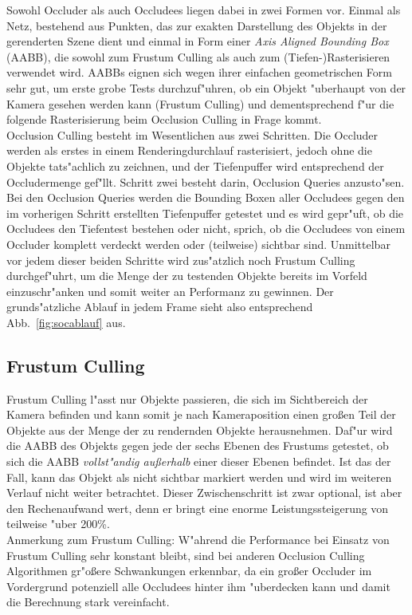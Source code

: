 \documentclass[journal]{vgtc}
\begin{document}
Sowohl Occluder als auch Occludees liegen dabei in zwei Formen vor.
Einmal als Netz, bestehend aus Punkten, das zur exakten Darstellung des Objekts in der gerenderten Szene dient und einmal in Form einer \textit{Axis Aligned Bounding Box} (AABB), die sowohl zum Frustum Culling als auch zum (Tiefen-)Rasterisieren verwendet wird.
AABBs eignen sich wegen ihrer einfachen geometrischen Form sehr gut, um erste grobe Tests durchzuf"uhren, ob ein Objekt "uberhaupt von der Kamera gesehen werden kann (Frustum Culling) und dementsprechend f"ur die folgende Rasterisierung beim Occlusion Culling in Frage kommt. \\

Occlusion Culling besteht im Wesentlichen aus zwei Schritten.
Die Occluder werden als erstes in einem Renderingdurchlauf rasterisiert, jedoch ohne die Objekte tats"achlich zu zeichnen, und der Tiefenpuffer wird entsprechend der Occludermenge gef"llt.
Schritt zwei besteht darin, Occlusion Queries anzusto"sen.
Bei den Occlusion Queries werden die Bounding Boxen aller Occludees gegen den im vorherigen Schritt erstellten Tiefenpuffer getestet und es wird gepr"uft, ob die Occludees den Tiefentest bestehen oder nicht, sprich, ob die Occludees von einem Occluder komplett verdeckt werden oder (teilweise) sichtbar sind.
Unmittelbar vor jedem dieser beiden Schritte wird zus"atzlich noch Frustum Culling durchgef"uhrt, um die Menge der zu testenden Objekte bereits im Vorfeld einzuschr"anken und somit weiter an Performanz zu gewinnen.
Der grunds"atzliche Ablauf in jedem Frame sieht also entsprechend Abb.\ \ref{fig:socablauf} aus.

\subsection{Frustum Culling}
Frustum Culling l"asst nur Objekte passieren, die sich im Sichtbereich der Kamera befinden und kann somit je nach Kameraposition einen gro{\ss}en Teil der Objekte aus der Menge der zu rendernden Objekte herausnehmen.
Daf"ur wird die AABB des Objekts gegen jede der sechs Ebenen des Frustums getestet, ob sich die AABB \textit{vollst"andig au{\ss}erhalb} einer dieser Ebenen befindet.
Ist das der Fall, kann das Objekt als nicht sichtbar markiert werden und wird im weiteren Verlauf nicht weiter betrachtet. Dieser Zwischenschritt ist zwar optional, ist aber den Rechenaufwand wert, denn er bringt eine enorme Leistungssteigerung von teilweise "uber 200\%.\\
Anmerkung zum Frustum Culling: W"ahrend die Performance bei Einsatz von Frustum Culling sehr konstant bleibt, sind bei anderen Occlusion Culling Algorithmen gr"o\ss{}ere Schwankungen erkennbar, da ein gro\ss{}er Occluder im Vordergrund potenziell alle Occludees hinter ihm "uberdecken kann und damit die Berechnung stark vereinfacht.\\
\end{document}
